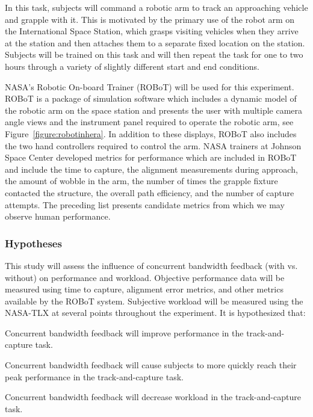 In this task, subjects will command a robotic arm to track an approaching vehicle and grapple with it.
This is motivated by the primary use of the robot arm on the International Space Station, which grasps visiting vehicles when they arrive at the station and then attaches them to a separate fixed location on the station.
Subjects will be trained on this task and will then repeat the task for one to two hours through a variety of slightly different start and end conditions.

NASA's Robotic On-board Trainer (ROBoT) will be used for this experiment.
ROBoT is a package of simulation software which includes a dynamic model of the robotic arm on the space station and presents the user with multiple camera angle views and the instrument panel required to operate the robotic arm, see Figure~\ref{figure:robotinhera}.
In addition to these displays, ROBoT also includes the two hand controllers required to control the arm.
NASA trainers at Johnson Space Center developed metrics for performance which are included in ROBoT and include the time to capture, the alignment measurements during approach, the amount of wobble in the arm, the number of times the grapple fixture contacted the structure, the overall path efficiency, and the number of capture attempts.
The preceding list presents candidate metrics from which we may observe human performance.

\subsubsection{Hypotheses}
This study will assess the influence of concurrent bandwidth feedback (with vs. without) on performance and workload.
Objective performance data will be measured using time to capture, alignment error metrics, and other metrics available by the ROBoT system.
Subjective workload will be measured using the NASA-TLX at several points throughout the experiment.
It is hypothesized that:
\begin{description}[align=left]
\item [Hypothesis 1] Concurrent bandwidth feedback will improve performance in the track-and-capture task.
\item [Hypothesis 2] Concurrent bandwidth feedback will cause subjects to more quickly reach their peak performance in the track-and-capture task.
\item [Hypothesis 3] Concurrent bandwidth feedback will decrease workload in the track-and-capture task.
\end{description}

